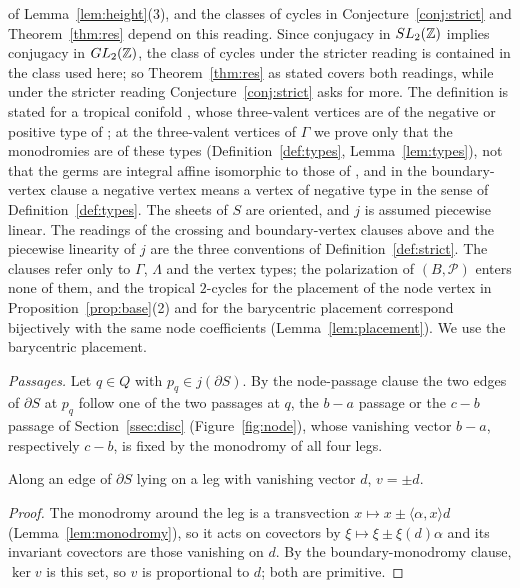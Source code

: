 of Lemma~\ref{lem:height}(3), and the classes of cycles in Conjecture~\ref{conj:strict} and Theorem~\ref{thm:res} depend on this reading. Since conjugacy
in $SL_2(\mathbb Z)$ implies conjugacy in $GL_2(\mathbb Z)$, the class of cycles under the stricter reading is contained in the class
used here; so Theorem~\ref{thm:res} as stated covers both readings, while under the stricter reading
Conjecture~\ref{conj:strict} asks for more. The definition \cite[Def.~7.2]{CBM} is
stated for a tropical conifold \cite[Def.~6.3]{CBM}, whose three-valent vertices are of
the negative or positive type of \cite[Ex.~2.3, 2.4]{CBM}; at the three-valent vertices of $\Gamma$ we prove only that the
monodromies are of these types (Definition~\ref{def:types}, Lemma~\ref{lem:types}), not that the germs are integral affine
isomorphic to those of \cite[Ex.~2.3, 2.4]{CBM}, and in the boundary-vertex clause a negative vertex means a vertex of negative type in the sense of
Definition~\ref{def:types}.
The sheets of $S$ are oriented, and $j$ is assumed piecewise linear. The readings of the crossing and boundary-vertex clauses above and the piecewise
linearity of $j$ are the three conventions of Definition~\ref{def:strict}. The clauses refer only to $\Gamma$, $\Lambda$ and
the vertex types; the polarization of $(B,\mathscr P)$ enters none of them, and the tropical $2$-cycles for the
placement of the node vertex in Proposition~\ref{prop:base}(2) and for the barycentric placement correspond bijectively
with the same node coefficients (Lemma~\ref{lem:placement}). We use the barycentric placement.

\emph{Passages.} Let $q\in Q$ with $p_q\in j(\partial S)$. By the node-passage clause the two edges of $\partial S$ at $p_q$ follow one of the
two passages at $q$, the $b-a$ passage or the $c-b$ passage of Section~\ref{ssec:disc} (Figure~\ref{fig:node}), whose
vanishing vector $b-a$, respectively $c-b$, is fixed by the monodromy of all four legs.

\begin{lemma}\label{lem:boundaryfield}
Along an edge of $\partial S$ lying on a leg with vanishing vector $d$, $v=\pm d$.
\end{lemma}

\begin{proof}
The monodromy around the leg is a transvection $x\mapsto x\pm\langle\alpha,x\rangle d$ (Lemma~\ref{lem:monodromy}), so
it acts on covectors by $\xi\mapsto\xi\pm\xi(d)\alpha$ and its invariant covectors are those vanishing on $d$. By the boundary-monodromy clause,
$\ker v$ is this set, so $v$ is proportional to $d$; both are primitive.
\end{proof}

